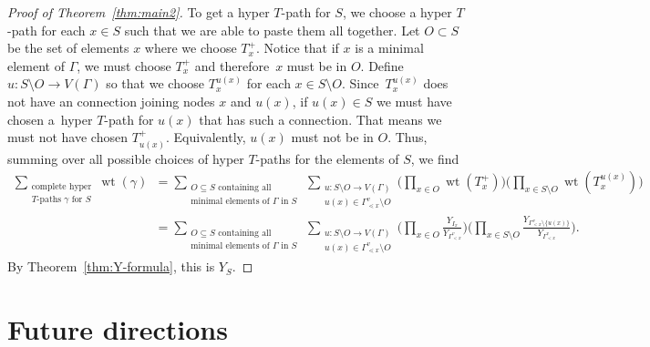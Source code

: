 \documentclass[10pt,a4paper]{amsart}
\numberwithin{equation}{section}
\DeclareMathOperator{\wt}{wt}
\begin{document}
\begin{proof}[Proof of Theorem~\ref{thm:main2}]
To get a hyper $T$-path for $S$, we choose a hyper $T$-path for each $x\in S$ such that we are able to paste them all together. Let $O\subset S$ be the set of elements $x$ where we choose $T_x^{+}$. Notice that if $x$ is a minimal element of $\Gamma$, we must choose $T_x^{+}$ and therefore~$x$ must be in $O$. Define $u\colon S\setminus O\to V(\Gamma)$ so that we choose $T_x^{u(x)}$ for each $x\in S\setminus O$. Since~$T_x^{u(x)}$ does not have an connection joining nodes $x$ and $u(x)$, if $u(x)\in S$ we must have chosen a~hyper $T$-path for $u(x)$ that has such a connection. That means we must not have chosen $T_{u(x)}^+$. Equivalently, $u(x)$ must not be in $O$.
Thus, summing over all possible choices of hyper $T$-paths for the elements of $S$, we find
\begin{align*}
\sum_{\substack{\text{complete hyper}\\T\text{-paths }\gamma\text{ for }S}}\wt(\gamma)&=\sum_{\substack{O\subseteq S\text{ containing all}\\ \text{minimal elements of }\Gamma\text{ in }S}} \, \sum_{\substack{u\colon S\setminus O\to V(\Gamma)\\ u(x)\in\Gamma_{\lessdot x}^v\setminus O}}\bigg(\prod_{x\in O}\wt(T_x^{+})\bigg)\bigg(\prod_{x\in S\setminus O}\wt(T_x^{u(x)})\bigg)\\
&=\sum_{\substack{O\subseteq S\text{ containing all}\\ \text{minimal elements of }\Gamma\text{ in }S}} \, \sum_{\substack{u\colon S\setminus O\to V(\Gamma)\\ u(x)\in\Gamma_{\lessdot x}^v\setminus O}}\bigg(\prod_{x\in O}\frac{Y_{I_{x}}}{Y_{\Gamma_{< x}^v}}\bigg)\bigg(\prod_{x\in S\setminus O}\frac{Y_{\Gamma_{< x}^v\setminus\{u(x)\}} }{Y_{\Gamma_{< x}^v}}\bigg).
\end{align*}
By Theorem~\ref{thm:Y-formula}, this is $Y_S$.
\end{proof}

\section{Future directions}\label{sec:future}
\end{document}
